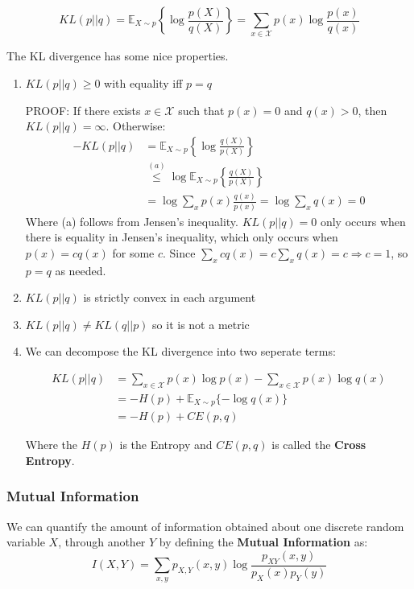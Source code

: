 \documentclass[]{article}
\theoremstyle{mattstyle}
\theoremstyle{definition}
\begin{document}
\begin{equation}
KL(p||q) = \mathbb{E}_{X\sim p}\left\{\log \frac{p(X)}{q(X)}\right\} = \sum_{x\in\mathcal{X}}p(x)\log\frac{p(x)}{q(x)}
\end{equation}

The KL divergence has some nice properties.
\begin{enumerate}
	\item $KL(p||q) \ge 0$ with equality iff $p=q$
	
	PROOF: If there exists $x \in \mathcal{X}$ such that $p(x) = 0$ and $q(x) > 0$, then $KL(p || q) = \infty$.	Otherwise:
	\begin{align*}
	-KL(p||q) &= \mathbb{E}_{X\sim p}\left\{\log \frac{q(X)}{p(X)}\right\}\\
	&\overset{(a)}{\le} \log \mathbb{E}_{X\sim p}\left\{\frac{q(X)}{p(X)}\right\} \\
	&= \log \sum_{x} p(x)\frac{q(x)}{p(x)} = \log \sum_{x} q(x) = 0
	\end{align*}
	Where (a) follows from Jensen's inequality. $KL(p||q) = 0$ only occurs when there is equality in Jensen's inequality, which only occurs when $p(x)=cq(x)$ for some $c$. Since $\sum_{x}cq(x) = c\sum_{x}q(x) = c \Rightarrow c=1$, so $p=q$ as needed.
	
	\item $KL(p||q)$ is strictly convex in each argument
	
	\item $KL(p||q) \ne KL(q||p)$ so it is not a metric
	
	\item We can decompose the KL divergence into two seperate terms:
	
	\begin{align} KL(p||q) &= \sum_{x\in\mathcal{X}}p(x)\log p(x) - \sum_{x\in\mathcal{X}}p(x)\log q(x) \\
	&= -H(p) + \mathbb{E}_{X\sim p}\{-\log q(x)\} \\
	&= -H(p) + CE(p,q)
	\end{align}
	
	Where the $H(p)$ is the Entropy and $CE(p,q)$ is called the \textbf{Cross Entropy}.
	
\end{enumerate}

\subsubsection{Mutual Information}
We can quantify the amount of information obtained about one discrete random variable $X$, through another $Y$ by defining the \textbf{Mutual Information} as:
\begin{equation}
I(X,Y)=\sum_{x,y}p_{X,Y}(x,y)\log\frac{p_{XY}(x,y)}{p_X(x)p_Y(y)}
\end{equation}
\end{document}

